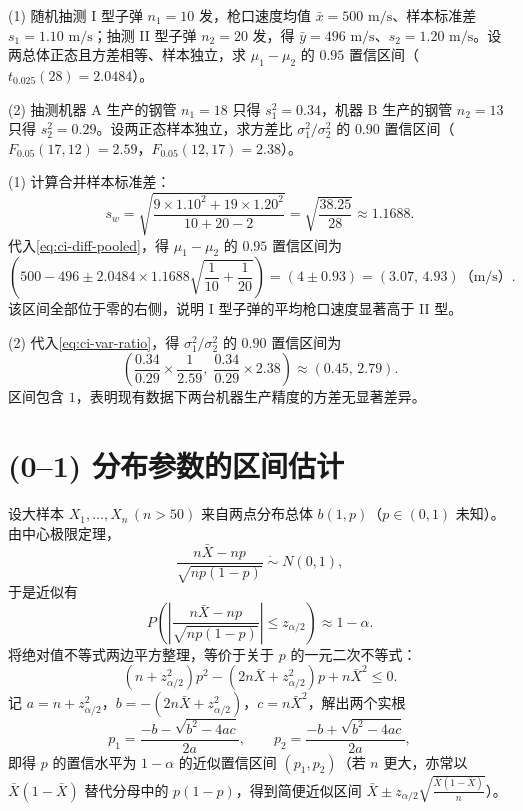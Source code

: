 \begin{example}[title={两正态总体的均值差与方差比置信区间}]
\label{eg:two-normal-ci}
(1) 随机抽测 I 型子弹 $n_1=10$ 发，枪口速度均值 $\bar{x}=500\text{ m/s}$、样本标准差 $s_1=1.10\text{ m/s}$；抽测 II 型子弹 $n_2=20$ 发，得 $\bar{y}=496\text{ m/s}$、$s_2=1.20\text{ m/s}$。设两总体正态且方差相等、样本独立，求 $\mu_1-\mu_2$ 的 $0.95$ 置信区间（$t_{0.025}(28)=2.0484$）。

(2) 抽测机器 A 生产的钢管 $n_1=18$ 只得 $s_1^2=0.34$，机器 B 生产的钢管 $n_2=13$ 只得 $s_2^2=0.29$。设两正态样本独立，求方差比 $\sigma_1^2/\sigma_2^2$ 的 $0.90$ 置信区间（$F_{0.05}(17,12)=2.59$，$F_{0.05}(12,17)=2.38$）。
\begin{solution}
(1) 计算合并样本标准差：
\[
  s_w=\sqrt{\frac{9\times 1.10^2+19\times 1.20^2}{10+20-2}}=\sqrt{\frac{38.25}{28}}\approx 1.1688.
\]
代入\eqref{eq:ci-diff-pooled}，得 $\mu_1-\mu_2$ 的 $0.95$ 置信区间为
\[
  \left(500-496\pm 2.0484\times 1.1688\sqrt{\frac{1}{10}+\frac{1}{20}}\right)
  =(4\pm 0.93)=(3.07,\,4.93)\text{（m/s）}.
\]
该区间全部位于零的右侧，说明 I 型子弹的平均枪口速度显著高于 II 型。

(2) 代入\eqref{eq:ci-var-ratio}，得 $\sigma_1^2/\sigma_2^2$ 的 $0.90$ 置信区间为
\[
  \left(\frac{0.34}{0.29}\times\frac{1}{2.59},\;\frac{0.34}{0.29}\times 2.38\right)
  \approx(0.45,\,2.79).
\]
区间包含 $1$，表明现有数据下两台机器生产精度的方差无显著差异。
\end{solution}
\end{example}

\section{(0--1) 分布参数的区间估计}
\label{sec:bernoulli-ci}

设大样本 $X_1,\ldots,X_n\,(n>50)$ 来自两点分布总体 $b(1,p)$（$p\in(0,1)$ 未知）。由中心极限定理，
\[
  \frac{n\bar{X}-np}{\sqrt{np(1-p)}}\;\dot{\sim}\;N(0,1),
\]
于是近似有
\[
  P\!\left(\left|\frac{n\bar{X}-np}{\sqrt{np(1-p)}}\right|\le z_{\alpha/2}\right)\approx 1-\alpha.
\]
将绝对值不等式两边平方整理，等价于关于 $p$ 的一元二次不等式：
\begin{equation}
  (n+z_{\alpha/2}^2)p^2-(2n\bar{X}+z_{\alpha/2}^2)p+n\bar{X}^2\le 0.
  \label{eq:wilson-quadratic}
\end{equation}
记 $a=n+z_{\alpha/2}^2$，$b=-(2n\bar{X}+z_{\alpha/2}^2)$，$c=n\bar{X}^2$，解出两个实根
\[
  p_1=\frac{-b-\sqrt{b^2-4ac}}{2a},\qquad p_2=\frac{-b+\sqrt{b^2-4ac}}{2a},
\]
即得 $p$ 的置信水平为 $1-\alpha$ 的近似置信区间 $(p_1,p_2)$（若 $n$ 更大，亦常以 $\bar{X}(1-\bar{X})$ 替代分母中的 $p(1-p)$，得到简便近似区间 $\bar{X}\pm z_{\alpha/2}\sqrt{\frac{\bar{X}(1-\bar{X})}{n}}$）。

